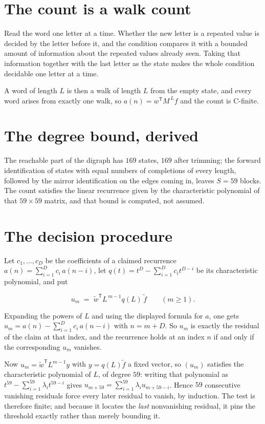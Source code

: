 \documentclass[11pt]{article}
\theoremstyle{definition}
\begin{document}
\section{The count is a walk count}

Read the word one letter at a time. Whether the new letter is a repeated value is decided by the letter before it, and the condition compares it with a bounded amount of information about the repeated values already seen. Taking that information together with the last letter as the state makes the whole condition decidable one letter at a time.

A word of length $L$ is then a walk of length $L$ from the empty state, and every word arises from exactly one walk, so $a(n) = w^{\mathsf T}M^{\,L}f$ and the count is C-finite.

\section{The degree bound, derived}

The reachable part of the digraph has $169$ states, $169$ after trimming; the forward identification of states with equal numbers of completions of every length, followed by the mirror identification on the edges coming in, leaves $S = 59$ blocks. The count satisfies the linear recurrence given by the characteristic polynomial of that $59\times59$ matrix, and that bound is computed, not assumed.

\section{The decision procedure}

Let $c_1,\dots,c_D$ be the coefficients of a claimed recurrence $a(n) = \sum_{i=1}^{D} c_i\,a(n-i)$, let $q(t) = t^{D} - \sum_{i=1}^{D} c_i t^{D-i}$ be its characteristic polynomial, and put

\[u_m \;=\; \tilde w^{\mathsf T} L^{\,m-1} q(L)\,\tilde f \qquad (m \ge 1).\]

Expanding the powers of $L$ and using the displayed formula for $a$, one gets $u_m = a(n) - \sum_{i=1}^{D} c_i\,a(n-i)$ with $n = m + D$. So $u_m$ is exactly the residual of the claim at that index, and the recurrence holds at an index $n$ if and only if the corresponding $u_m$ vanishes.

Now $u_m = \tilde w^{\mathsf T} L^{m-1} y$ with $y = q(L)\tilde f$ a fixed vector, so $(u_m)$ satisfies the characteristic polynomial of $L$, of degree $59$: writing that polynomial as $t^{59} - \sum_{i=1}^{59} \lambda_i t^{59-i}$ gives $u_{m+59} = \sum_{i=1}^{59} \lambda_i u_{m+59-i}$. Hence $59$ consecutive vanishing residuals force every later residual to vanish, by induction. The test is therefore finite; and because it locates the {\itshape last} nonvanishing residual, it pins the threshold exactly rather than merely bounding it.
\end{document}
